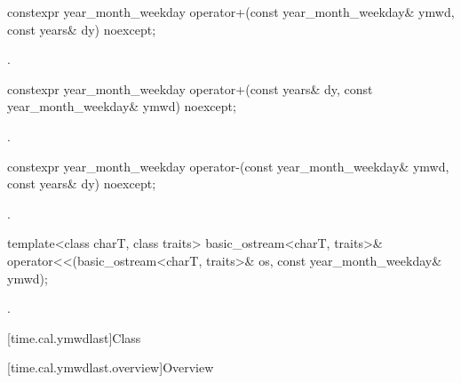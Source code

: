%
\begin{itemdecl}
constexpr year_month_weekday operator+(const year_month_weekday& ymwd, const years& dy) noexcept;
\end{itemdecl}

\begin{itemdescr}
\pnum
\returns {}.
\end{itemdescr}

%
\begin{itemdecl}
constexpr year_month_weekday operator+(const years& dy, const year_month_weekday& ymwd) noexcept;
\end{itemdecl}

\begin{itemdescr}
\pnum
\returns {}.
\end{itemdescr}

%
\begin{itemdecl}
constexpr year_month_weekday operator-(const year_month_weekday& ymwd, const years& dy) noexcept;
\end{itemdecl}

\begin{itemdescr}
\pnum
\returns {}.
\end{itemdescr}

%
\begin{itemdecl}
template<class charT, class traits>
  basic_ostream<charT, traits>&
    operator<<(basic_ostream<charT, traits>& os, const year_month_weekday& ymwd);
\end{itemdecl}

\begin{itemdescr}
\pnum
\returns {}.
\end{itemdescr}

[time.cal.ymwdlast]{Class }

[time.cal.ymwdlast.overview]{Overview}

